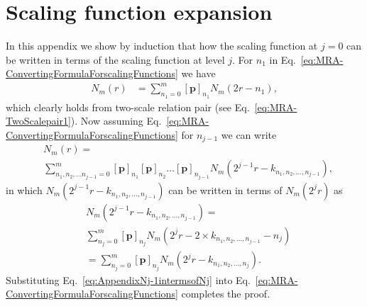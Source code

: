 \documentclass[review,authoryear,3p]{elsarticle}
\begin{document}
\section{Scaling function expansion}\label{ap:Induction}  
In this appendix we show by induction that how the scaling function at $j=0$ can be written in terms of the scaling function at level $j$. For $n_1$ in  Eq.~\eqref{eq:MRA-ConvertingFormulaForscalingFunctions} we have
\begin{align}
 N_{m}\left(r\right)&=\sum_{n_1=0}^{m} \left[\mathbf p\right]_{n_1} N_{m}\left(2r-n_1\right) \label{eq:App-TwoScalepair1},
  \end{align}
which clearly holds from two-scale relation pair (see Eq.~\eqref{eq:MRA-TwoScalepair1}). Now assuming Eq.~\eqref{eq:MRA-ConvertingFormulaForscalingFunctions} for $n_{j-1}$ we can write 
\begin{align}\label{eq:app-ConvertingFormulaForscalingFunctions}
 &N_m(r)=\nonumber \\
&\sum_{n_1,n_2, \dots n_{j-1}=0}^{m}\left[\mathbf p\right]_{n_1} \left[\mathbf p\right]_{n_2}\dots \left[\mathbf p\right]_{n_{j-1}}N_m(2^{j-1}r-k_{n_1,n_2, \dots, n_{j-1}}),
\end{align}
in which $N_m(2^{j-1}r-k_{n_1,n_2, \dots, n_{j-1}})$ can be written in terms of $N_m(2^{j}r)$ as
\begin{align}\label{eq:AppendixNj-1intermsofNj}
 &N_m(2^{j-1}r-k_{n_1,n_2, \dots, n_{j-1}})=\nonumber \\
&\sum_{n_j=0}^m \left[\mathbf p\right]_{n_j}N_m(2^jr-2\times k_{n_1,n_2, \dots, n_{j-1}}-n_j)\nonumber \\
&=\sum_{n_j=0}^m \left[\mathbf p\right]_{n_j}N_m(2^jr- k_{n_1,n_2, \dots, n_{j}}).
\end{align}
Substituting Eq.~\eqref{eq:AppendixNj-1intermsofNj} into Eq.~\eqref{eq:MRA-ConvertingFormulaForscalingFunctions} completes the proof. 
\end{document}
